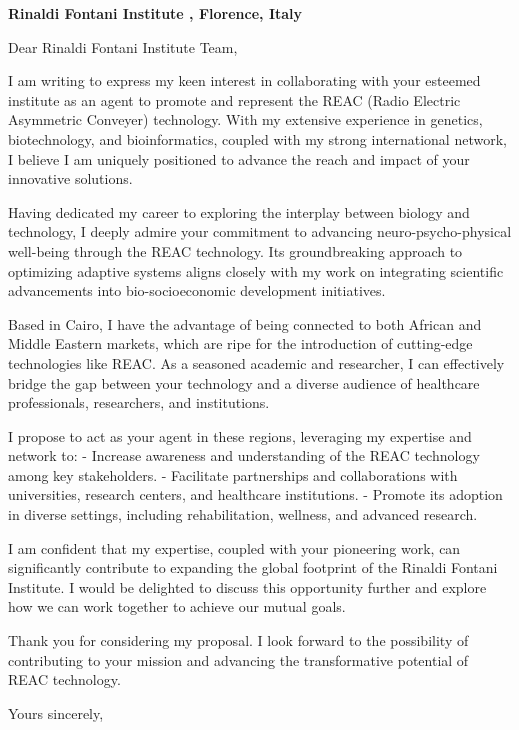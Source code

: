 \documentclass[a4paper,12pt]{letter}
\date{\today}
\begin{document}
  

\begin{letter}{\bf Rinaldi Fontani Institute ,  Florence, Italy}
\rm 
\opening{Dear Rinaldi Fontani Institute Team,}

I am writing to express my keen interest in collaborating with your esteemed institute as an agent to promote and represent the REAC (Radio Electric Asymmetric Conveyer) technology. With my extensive experience in genetics, biotechnology, and bioinformatics, coupled with my strong international network, I believe I am uniquely positioned to advance the reach and impact of your innovative solutions.

Having dedicated my career to exploring the interplay between biology and technology, I deeply admire your commitment to advancing neuro-psycho-physical well-being through the REAC technology. Its groundbreaking approach to optimizing adaptive systems aligns closely with my work on integrating scientific advancements into bio-socioeconomic development initiatives.

Based in Cairo, I have the advantage of being connected to both African and Middle Eastern markets, which are ripe for the introduction of cutting-edge technologies like REAC. As a seasoned academic and researcher, I can effectively bridge the gap between your technology and a diverse audience of healthcare professionals, researchers, and institutions.

I propose to act as your agent in these regions, leveraging my expertise and network to:
- Increase awareness and understanding of the REAC technology among key stakeholders.
- Facilitate partnerships and collaborations with universities, research centers, and healthcare institutions.
- Promote its adoption in diverse settings, including rehabilitation, wellness, and advanced research.

I am confident that my expertise, coupled with your pioneering work, can significantly contribute to expanding the global footprint of the Rinaldi Fontani Institute. I would be delighted to discuss this opportunity further and explore how we can work together to achieve our mutual goals.

Thank you for considering my proposal. I look forward to the possibility of contributing to your mission and advancing the transformative potential of REAC technology.

\closing{Yours sincerely,}
\end{letter}
\end{document}
